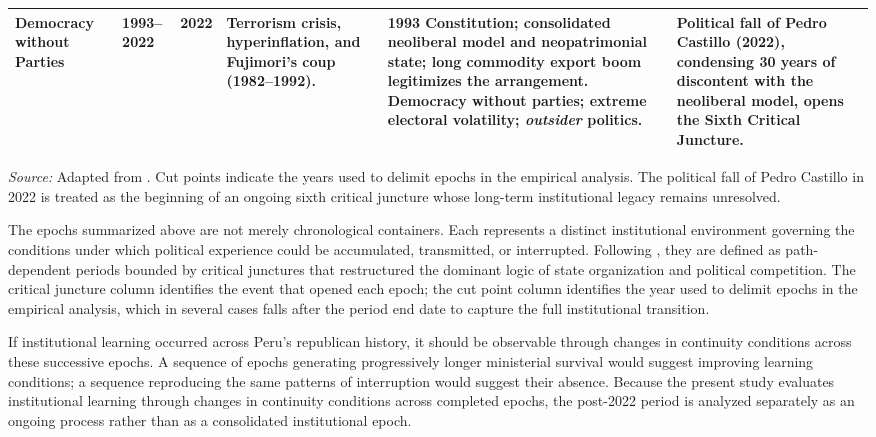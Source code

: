 \documentclass[doc, 12pt, a4paper,floatsintext]{apa7}
\begin{document}
\begin{table}[h]
\begin{tabular}{p{1.5cm}p{1cm}p{0.8cm}p{3cm}p{3cm}p{2.6cm}}
\midrule

Democracy without Parties &
1993--2022 &
2022 &
Terrorism crisis, hyperinflation, and Fujimori's coup (1982--1992). &
1993 Constitution; consolidated neoliberal model and neopatrimonial state; long commodity export boom legitimizes the arrangement. Democracy without parties; extreme electoral volatility; \textit{outsider} politics. &
Political fall of Pedro Castillo (2022), condensing 30 years of discontent with the neoliberal model, opens the Sixth Critical Juncture. \\

\bottomrule
\end{tabular}

\vspace{0.2cm}
\begin{minipage}{0.95\textwidth}
\scriptsize
\textit{Source:} Adapted from \textcite{lopez_jimenez_peru_2025}. Cut points indicate the years used to delimit epochs in the empirical analysis. The political fall of Pedro Castillo in 2022 is treated as the beginning of an ongoing sixth critical juncture whose long-term institutional legacy remains unresolved.
\end{minipage}

\end{table}


The epochs summarized above are not merely chronological containers. Each 
represents a distinct institutional environment governing the conditions under 
which political experience could be accumulated, transmitted, or interrupted. 
Following \textcite{lopez_jimenez_peru_2025}, they are defined as path-dependent 
periods bounded by critical junctures that restructured the dominant logic of 
state organization and political competition. The critical juncture column 
identifies the event that opened each epoch; the cut point column identifies 
the year used to delimit epochs in the empirical analysis, which in several 
cases falls after the period end date to capture the full institutional 
transition.

If institutional learning occurred across Peru's republican history, it should 
be observable through changes in continuity conditions across these successive 
epochs. A sequence of epochs generating progressively longer ministerial 
survival would suggest improving learning conditions; a sequence reproducing 
the same patterns of interruption would suggest their absence. Because the 
present study evaluates institutional learning through changes in continuity 
conditions across completed epochs, the post-2022 period is analyzed separately 
as an ongoing process rather than as a consolidated institutional epoch.
\end{document}
